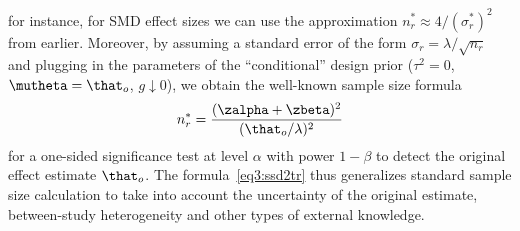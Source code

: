 for instance, for SMD effect sizes we can use the approximation
$n_{r}^{*} \approx 4/(\sigma^*_{r})^{2}$ from
earlier. %
Moreover, by assuming a standard error of the form
$\sigma_{r} = \lambda/\sqrt{n_{r}}$ and plugging in the parameters of the
``conditional'' design prior %
($\tau^{2} = 0$, $\mutheta = \that_{o}$, $g \downarrow 0$), we obtain the
well-known sample size formula \citep[ch. 3.3]{Matthews2006}
\begin{align*}
  n_{r}^{*} = \frac{(\zalpha + \zbeta)^{2}}{(\that_{o}/\lambda)^{2}}
\end{align*}
for a one-sided significance test at level $\alpha$ with power $1 - \beta$ to
detect the original effect estimate $\that_{o}$. The formula~\eqref{eq3:ssd2tr}
thus generalizes standard sample size calculation to take into account the
uncertainty of the original estimate, between-study heterogeneity and other
types of external knowledge.


